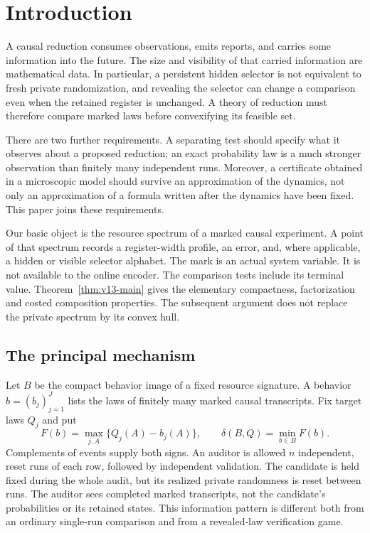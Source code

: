 \section{Introduction}
A causal reduction consumes observations, emits reports, and carries some
information into the future. The size and visibility of that carried
information are mathematical data. In particular, a persistent hidden
selector is not equivalent to fresh private randomization, and revealing
the selector can change a comparison even when the retained register is
unchanged. A theory of reduction must therefore compare marked laws before
convexifying its feasible set.

There are two further requirements. A separating test should specify what
it observes about a proposed reduction; an exact probability law is a much
stronger observation than finitely many independent runs. Moreover, a
certificate obtained in a microscopic model should survive an approximation
of the dynamics, not only an approximation of a formula written after the
dynamics have been fixed. This paper joins these requirements.

Our basic object is the resource spectrum of a marked causal experiment.
A point of that spectrum records a register-width profile, an error, and,
where applicable, a hidden or visible selector alphabet. The mark is an
actual system variable. It is not available to the online encoder. The
comparison tests include its terminal value. Theorem~\ref{thm:v13-main}
gives the elementary compactness, factorization and costed composition
properties. The subsequent argument does not replace the private spectrum
by its convex hull.

\subsection{The principal mechanism}
Let $B$ be the compact behavior image of a fixed resource signature. A
behavior $b=(b_j)_{j=1}^J$ lists the laws of finitely many marked causal
transcripts. Fix target laws $Q_j$ and put
\[
 F(b)=\max_{j,A}\{Q_j(A)-b_j(A)\},\qquad
 \delta(B,Q)=\min_{b\in B}F(b).
\]
Complements of events supply both signs. An auditor is allowed $n$
independent, reset runs of each row, followed by independent validation.
The candidate is held fixed during the whole audit, but its realized
private randomness is reset between runs. The auditor sees completed marked
transcripts, not the candidate's probabilities or its retained states.
This information pattern is different both from an ordinary single-run
comparison and from a revealed-law verification game.

